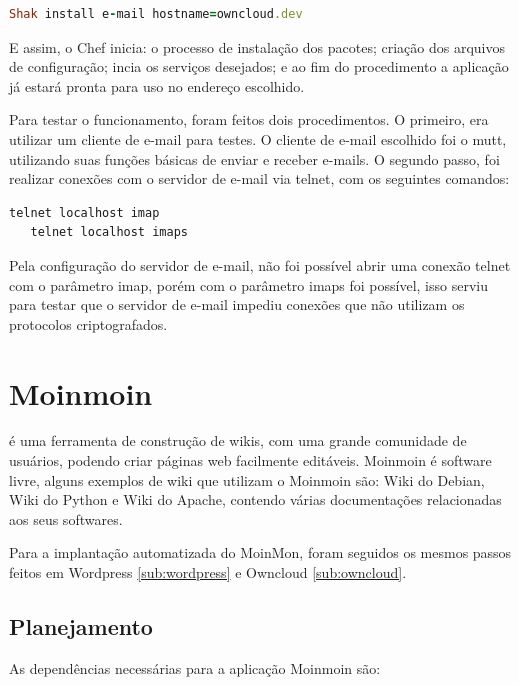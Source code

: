 \begin{lstlisting}[language=Ruby,label=dice_index,caption={Exemplo de execução de instalação do servidor de e-mail com shak}]
Shak install e-mail hostname=owncloud.dev
\end{lstlisting}


E assim, o Chef inicia: o processo de instalação dos pacotes; criação dos arquivos
de configuração; incia os serviços desejados; e ao fim do procedimento a aplicação
já estará pronta para uso no endereço escolhido.

Para testar o funcionamento, foram feitos dois procedimentos. O primeiro, era utilizar
um cliente de e-mail para testes. O cliente de e-mail escolhido foi o mutt, utilizando
suas funções básicas de enviar e receber e-mails. O segundo passo, foi realizar conexões
com o servidor de e-mail via telnet, com os seguintes comandos:

\begin{lstlisting}[language=Ruby,label=dice_index,caption={Exemplo de teste de conexão telnet no servidor imap}]
   telnet localhost imap
   telnet localhost imaps
\end{lstlisting}

Pela configuração do servidor de e-mail, não foi possível abrir uma conexão telnet
com o parâmetro imap, porém com o parâmetro imaps foi possível, isso serviu para testar 
que o servidor de e-mail impediu conexões que não 
utilizam os protocolos criptografados.

\section{Moinmoin}
\label{sub:moinmoin}

\cite{moin} é uma ferramenta de construção
de wikis, com uma grande comunidade de usuários, podendo criar páginas web
facilmente editáveis. Moinmoin é software livre, alguns exemplos
de wiki que utilizam o Moinmoin são: Wiki do Debian, Wiki do Python e Wiki do Apache,
contendo várias documentações relacionadas aos seus softwares. 

Para a implantação automatizada do MoinMon, foram seguidos os mesmos passos
feitos em Wordpress \ref{sub:wordpress} e Owncloud \ref{sub:owncloud}.

\subsection{Planejamento}

As dependências necessárias para a aplicação Moinmoin são:

